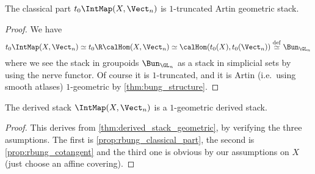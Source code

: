        \begin{prop}
            \label{prop:rbung_classical_part}
            The classical part $t_0 \IntMap(X, \Vect_n)$ is $1$-truncated Artin geometric stack.
        \end{prop}
        \begin{proof}
            We have \[t_0 \IntMap(X, \Vect_n) \simeq t_0 \R\calHom(X, \Vect_n) \simeq \calHom(t_0(X), t_0(\Vect_n)) \stackrel{\mathrm{def}}{\simeq} \Bun_{\GL_n} \] where we see the stack in groupoids $\Bun_{\GL_n}$ as a stack in simplicial sets by using the nerve functor. Of course it is $1$-truncated, and it is Artin (i.e.\ using smooth atlases) $1$-geometric by \cref{thm:bung_structure}.
        \end{proof}

        \begin{thm}
            \label{thm:rbung_geometric}
            The derived stack $\IntMap(X, \Vect_n)$ is a $1$-geometric derived stack.
        \end{thm}
        \begin{proof}
            This derives from \cref{thm:derived_stack_geometric}, by verifying the three asumptions. The first is \cref{prop:rbung_classical_part}, the second is \cref{prop:rbung_cotangent} and the third one is obvious by our assumptions on $X$ (just choose an affine covering).
        \end{proof}
